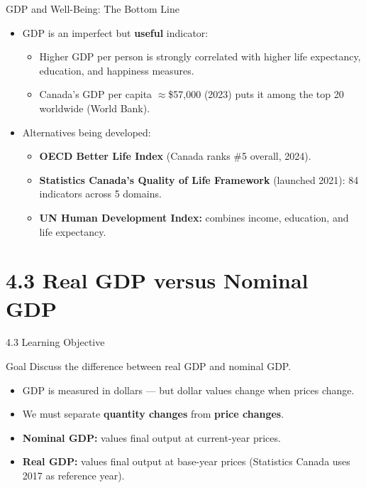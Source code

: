 \documentclass[aspectratio=169]{beamer}
\begin{document}
\begin{frame}{GDP and Well-Being: The Bottom Line}
\transfade
\begin{itemize}[<+->]
  \item GDP is an \alert{imperfect} but \textbf{useful} indicator:
  \begin{itemize}[<+->]
    \item Higher GDP per person is strongly correlated with higher life expectancy, education, and happiness measures.
    \item Canada's GDP per capita $\approx$\$57,000 (2023) puts it among the top 20 worldwide (World Bank).
  \end{itemize}
  \item Alternatives being developed:
  \begin{itemize}[<+->]
    \item \textbf{OECD Better Life Index} (Canada ranks \#5 overall, 2024).
    \item \textbf{Statistics Canada's Quality of Life Framework} (launched 2021): 84 indicators across 5 domains.
    \item \textbf{UN Human Development Index:} combines income, education, and life expectancy.
  \end{itemize}
\end{itemize}
\end{frame}

\section{4.3 Real GDP versus Nominal GDP}

\begin{frame}{4.3 Learning Objective}
\transfade
\begin{block}{Goal}
Discuss the difference between real GDP and nominal GDP.
\end{block}
\begin{itemize}[<+->]
  \item GDP is measured in dollars --- but dollar values change when prices change.
  \item We must separate \textbf{quantity changes} from \textbf{price changes}.
  \item \textbf{Nominal GDP:} values final output at \alert{current-year prices}.
  \item \textbf{Real GDP:} values final output at \alert{base-year prices} (Statistics Canada uses 2017 as reference year).
\end{itemize}
\end{frame}
\end{document}
